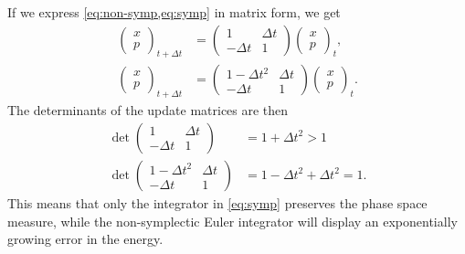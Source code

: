 If we express \cref{eq:non-symp,eq:symp} in matrix form, we get
\begin{align}
  \begin{pmatrix}
    x \\ p  
  \end{pmatrix}_{t + \Delta t}
  &=
  \begin{pmatrix}
    1 & \Delta t \\
    -\Delta t & 1
  \end{pmatrix}
  \begin{pmatrix}
    x \\ p
  \end{pmatrix}_{t}, \\
  \begin{pmatrix}
    x \\ p
  \end{pmatrix}_{t + \Delta t}
  &=
  \begin{pmatrix}
    1 - \Delta t^{2} & \Delta t \\
    - \Delta t & 1
  \end{pmatrix}
  \begin{pmatrix}
    x \\ p
  \end{pmatrix}_{t}.
\end{align}
The determinants of the update matrices are then
\begin{align}
  \det \begin{pmatrix}
    1 & \Delta t \\
    - \Delta t & 1
  \end{pmatrix}
  &= 1 + \Delta t^{2} > 1 \\
  \det \begin{pmatrix}
    1 - \Delta t^{2} & \Delta t \\
    - \Delta t & 1
  \end{pmatrix}
  &= 1 - \Delta t^{2} + \Delta t^{2} = 1.
\end{align}
This means that only the integrator in \cref{eq:symp} preserves the phase space
measure, while the non-symplectic Euler integrator will display an exponentially
growing error in the energy.

